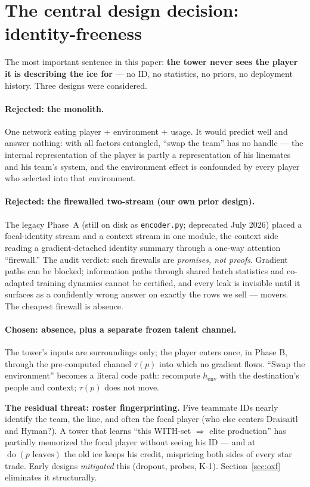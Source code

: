 \documentclass[11pt]{article}
\newcommand{\henv}{\ensuremath{h_{\mathrm{env}}}}
\newcommand{\dodo}[1]{\ensuremath{\operatorname{do}(#1)}}
\begin{document}
\section{The central design decision: identity-freeness}
\label{sec:identity}
The most important sentence in this paper: \textbf{the tower never sees the
player it is describing the ice for} --- no ID, no statistics, no priors, no
deployment history. Three designs were considered.

\paragraph{Rejected: the monolith.} One network eating player + environment +
usage. It would predict well and answer nothing: with all factors entangled,
``swap the team'' has no handle --- the internal representation of the player is
partly a representation of his linemates and his team's system, and the
environment effect is confounded by every player who selected into that
environment.

\paragraph{Rejected: the firewalled two-stream (our own prior design).}
The legacy Phase~A (still on disk as \texttt{encoder.py}; deprecated July 2026)
placed a focal-identity stream and a context stream in one module, the context
side reading a gradient-detached identity summary through a one-way attention
``firewall.'' The audit verdict: such firewalls are \emph{promises, not proofs}.
Gradient paths can be blocked; information paths through shared batch
statistics and co-adapted training dynamics cannot be certified, and every leak
is invisible until it surfaces as a confidently wrong answer on exactly the rows
we sell --- movers. The cheapest firewall is absence.

\paragraph{Chosen: absence, plus a separate frozen talent channel.}
The tower's inputs are surroundings only; the player enters once, in Phase B,
through the pre-computed channel $\tau(p)$ into which no gradient flows.
``Swap the environment'' becomes a literal code path: recompute \henv{} with the
destination's people and context; $\tau(p)$ does not move.

\begin{keybox}
\textbf{The residual threat: roster fingerprinting.} Five teammate IDs nearly
identify the team, the line, and often the focal player (who else centers
Draisaitl and Hyman?). A tower that learns ``this WITH-set $\Rightarrow$ elite
production'' has partially memorized the focal player without seeing his ID ---
and at $\dodo{p \text{ leaves}}$ the old ice keeps his credit, mispricing both
sides of every star trade. Early designs \emph{mitigated} this (dropout, probes,
K-1). Section~\ref{sec:oxf} eliminates it structurally.
\end{keybox}
\end{document}

